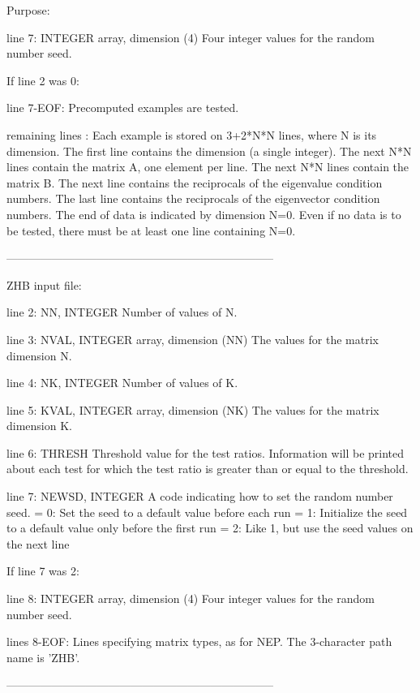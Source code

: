 \begin{DoxyParagraph}{Purpose\+: }
\begin{DoxyVerb}
 line 7: INTEGER array, dimension (4)
          Four integer values for the random number seed.

 If line 2 was 0:

 line 7-EOF: Precomputed examples are tested.

 remaining lines : Each example is stored on 3+2*N*N lines, where N is
          its dimension. The first line contains the dimension (a
          single integer). The next N*N lines contain the matrix A, one
          element per line. The next N*N lines contain the matrix B.
          The next line contains the reciprocals of the eigenvalue
          condition numbers.  The last line contains the reciprocals of
          the eigenvector condition numbers.  The end of data is
          indicated by dimension N=0.  Even if no data is to be tested,
          there must be at least one line containing N=0.

-----------------------------------------------------------------------

 ZHB input file:

 line 2:  NN, INTEGER
          Number of values of N.

 line 3:  NVAL, INTEGER array, dimension (NN)
          The values for the matrix dimension N.

 line 4:  NK, INTEGER
          Number of values of K.

 line 5:  KVAL, INTEGER array, dimension (NK)
          The values for the matrix dimension K.

 line 6:  THRESH
          Threshold value for the test ratios.  Information will be
          printed about each test for which the test ratio is greater
          than or equal to the threshold.

 line 7:  NEWSD, INTEGER
          A code indicating how to set the random number seed.
          = 0:  Set the seed to a default value before each run
          = 1:  Initialize the seed to a default value only before the
                first run
          = 2:  Like 1, but use the seed values on the next line

 If line 7 was 2:

 line 8:  INTEGER array, dimension (4)
          Four integer values for the random number seed.

 lines 8-EOF:  Lines specifying matrix types, as for NEP.
          The 3-character path name is 'ZHB'.

-----------------------------------------------------------------------


\end{DoxyVerb}
\end{DoxyParagraph}
